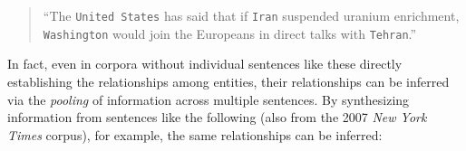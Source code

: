 \documentclass[11pt]{article}
\newcommand{\entity}[1]{\texttt{#1}}
\begin{document}
\begin{quote}
``The \entity{United States} has said that if \entity{Iran} suspended uranium enrichment, \entity{Washington} would join the Europeans in direct talks with \entity{Tehran}.''
\end{quote}
In fact, even in corpora without individual sentences like these directly establishing the relationships among entities, their relationships can be inferred via the \textit{pooling} of information across multiple sentences. By synthesizing information from sentences like the following (also from the 2007 \textit{New York Times} corpus), for example, the same relationships can be inferred:
\end{document}
